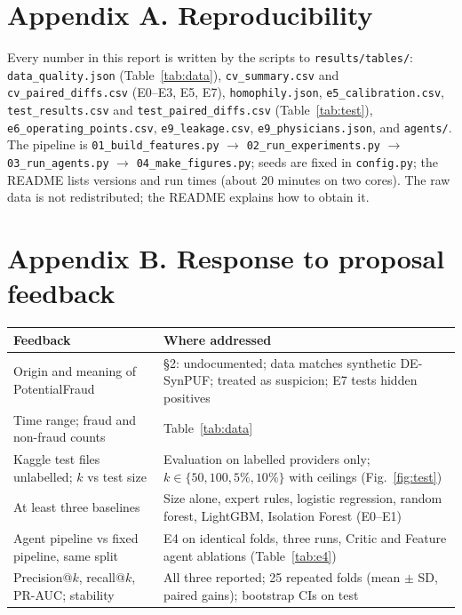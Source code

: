 \documentclass[11pt,a4paper]{article}
\begin{document}
\section*{Appendix A. Reproducibility}
\small\sloppy
Every number in this report is written by the scripts to \texttt{results/tables/}: \texttt{data\_quality.json} (Table~\ref{tab:data}), \texttt{cv\_summary.csv} and \texttt{cv\_paired\_diffs.csv} (E0--E3, E5, E7), \texttt{homophily.json}, \texttt{e5\_calibration.csv}, \texttt{test\_results.csv} and \texttt{test\_paired\_diffs.csv} (Table~\ref{tab:test}), \texttt{e6\_operating\_points.csv}, \texttt{e9\_leakage.csv}, \texttt{e9\_physicians.json}, and \texttt{agents/}. The pipeline is \texttt{01\_build\_features.py} $\rightarrow$ \texttt{02\_run\_experiments.py} $\rightarrow$ \texttt{03\_run\_agents.py} $\rightarrow$ \texttt{04\_make\_figures.py}; seeds are fixed in \texttt{config.py}; the README lists versions and run times (about 20 minutes on two cores). The raw data is not redistributed; the README explains how to obtain it.

\section*{Appendix B. Response to proposal feedback}
\begin{tabularx}{\linewidth}{p{5.2cm}X}
\toprule
Feedback & Where addressed \\
\midrule
Origin and meaning of PotentialFraud & \S2: undocumented; data matches synthetic DE-SynPUF; treated as suspicion; E7 tests hidden positives \\
Time range; fraud and non-fraud counts & Table~\ref{tab:data} \\
Kaggle test files unlabelled; $k$ vs test size & Evaluation on labelled providers only; $k\in\{50,100,5\%,10\%\}$ with ceilings (Fig.~\ref{fig:test}) \\
At least three baselines & Size alone, expert rules, logistic regression, random forest, LightGBM, Isolation Forest (E0--E1) \\
Agent pipeline vs fixed pipeline, same split & E4 on identical folds, three runs, Critic and Feature agent ablations (Table~\ref{tab:e4}) \\
Precision@$k$, recall@$k$, PR-AUC; stability & All three reported; 25 repeated folds (mean $\pm$ SD, paired gains); bootstrap CIs on test \\
\bottomrule
\end{tabularx}
\end{document}
